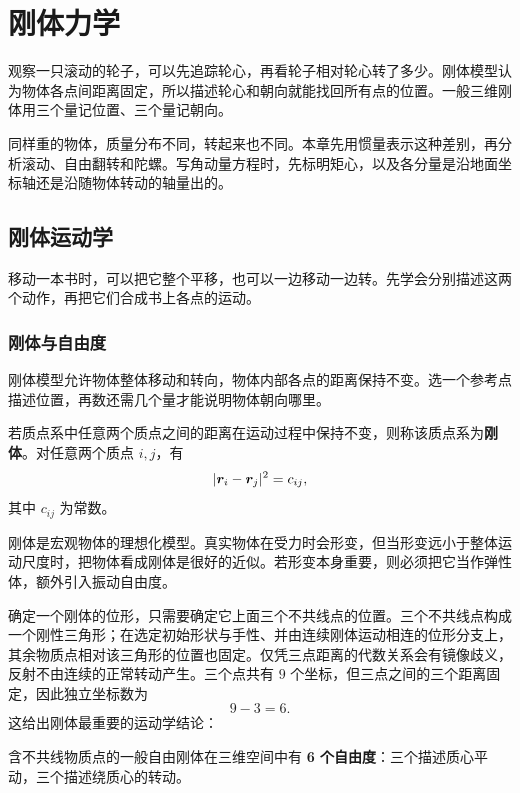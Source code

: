 \chapter{刚体力学}\label{ch:rigid}

\begin{guidebox}
观察一只滚动的轮子，可以先追踪轮心，再看轮子相对轮心转了多少。刚体模型认为物体各点间距离固定，所以描述轮心和朝向就能找回所有点的位置。一般三维刚体用三个量记位置、三个量记朝向。

同样重的物体，质量分布不同，转起来也不同。本章先用惯量表示这种差别，再分析滚动、自由翻转和陀螺。写角动量方程时，先标明矩心，以及各分量是沿地面坐标轴还是沿随物体转动的轴量出的。
\end{guidebox}

\section{刚体运动学}

移动一本书时，可以把它整个平移，也可以一边移动一边转。先学会分别描述这两个动作，再把它们合成书上各点的运动。

\subsection{刚体与自由度}

刚体模型允许物体整体移动和转向，物体内部各点的距离保持不变。选一个参考点描述位置，再数还需几个量才能说明物体朝向哪里。

\begin{definition}[刚体]
若质点系中任意两个质点之间的距离在运动过程中保持不变，则称该质点系为\textbf{刚体}。对任意两个质点 \(i,j\)，有
\[
|\boldsymbol{r}_i-\boldsymbol{r}_j|^2=c_{ij},
\]
其中 \(c_{ij}\) 为常数。
\end{definition}

刚体是宏观物体的理想化模型。真实物体在受力时会形变，但当形变远小于整体运动尺度时，把物体看成刚体是很好的近似。若形变本身重要，则必须把它当作弹性体，额外引入振动自由度。

确定一个刚体的位形，只需要确定它上面三个不共线点的位置。三个不共线点构成一个刚性三角形；在选定初始形状与手性、并由连续刚体运动相连的位形分支上，其余物质点相对该三角形的位置也固定。仅凭三点距离的代数关系会有镜像歧义，反射不由连续的正常转动产生。三个点共有 \(9\) 个坐标，但三点之间的三个距离固定，因此独立坐标数为
\[
9-3=6.
\]
这给出刚体最重要的运动学结论：

\begin{keybox}
含不共线物质点的一般自由刚体在三维空间中有 \textbf{6 个自由度}：三个描述质心平动，三个描述绕质心的转动。
\end{keybox}

